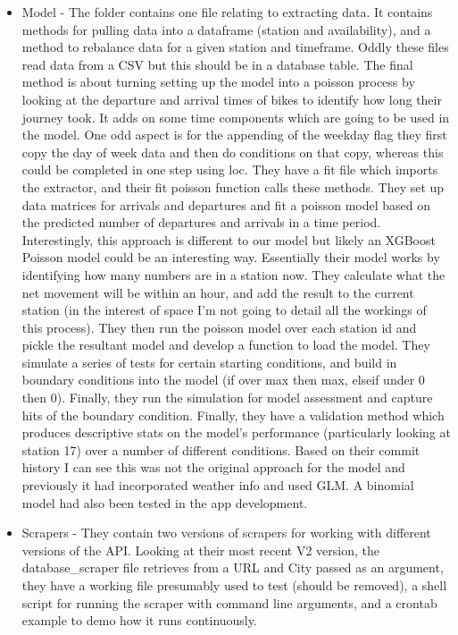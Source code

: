 \documentclass{scrreprt}
\begin{document}
\begin{itemize}
	\item Model - The folder contains one file relating to extracting data. It contains methods for pulling data into a dataframe (station and availability), and a method to rebalance data for a given station and timeframe. Oddly these files read data from a CSV but this should be in a database table. The final method is about turning setting up the model into a poisson process by looking at the departure and arrival times of bikes to identify how long their journey took. It adds on some time components which are going to be used in the model. One odd aspect is for the appending of the weekday flag they first copy the day of week data and then do conditions on that copy, whereas this could be completed in one step using loc. They have a fit file which imports the extractor, and their fit poisson function calls these methods. They set up data matrices for arrivals and departures and fit a poisson model based on the predicted number of departures and arrivals in a time period. Interestingly, this approach is different to our model but likely an XGBoost Poisson model could be an interesting way. Essentially their model works by identifying how many numbers are in a station now. They calculate what the net movement will be within an hour, and add the result to the current station (in the interest of space I'm not going to detail all the workings of this process). They then run the poisson model over each station id and pickle the resultant model and develop a function to load the model. They simulate a series of tests for certain starting conditions, and build in boundary conditions into the model (if over max then max, elseif under 0 then 0). Finally, they run the simulation for model assessment and capture hits of the boundary condition. Finally, they have a validation method which produces descriptive stats on the model's performance (particularly looking at station 17) over a number of different conditions. Based on their commit history I can see this was not the original approach for the model and previously it had incorporated weather info and used GLM. A binomial model had also been tested in the app development.
	\item Scrapers - They contain two versions of scrapers for working with different versions of the API. Looking at their most recent V2 version, the database\_scraper file retrieves from a URL and City passed as an argument, they have a working file presumably used to test (should be removed), a shell script for running the scraper with command line arguments, and a crontab example to demo how it runs continuously.

\end{itemize}
\end{document}

